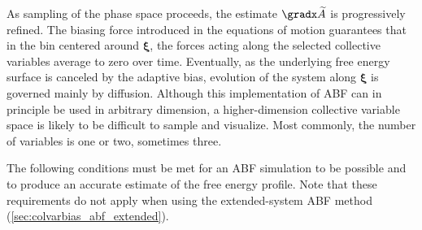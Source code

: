 As sampling of the phase space proceeds, the estimate
$\gradx \widetilde A$ is progressively refined. The biasing
force introduced in the equations of motion guarantees that in
the bin centered around $\bm{\xi}$,
the forces acting along the selected collective variables average
to zero over time. Eventually, as the underlying free energy surface is canceled
by the adaptive bias, evolution of the system along $\bm{\xi}$
is governed mainly by diffusion.
Although this implementation of ABF can in principle be used in
arbitrary dimension, a higher-dimension collective variable space is likely
to be difficult to sample and visualize.
Most commonly, the number of variables is one or two, sometimes three.



The following conditions must be met for an ABF simulation to be possible and
to produce an accurate estimate of the free energy profile.
Note that these requirements do not apply when using the extended-system
ABF method (\ref{sec:colvarbias_abf_extended}).

